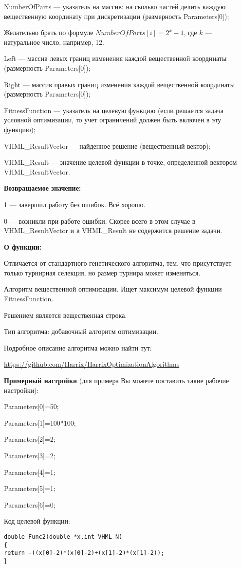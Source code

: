  NumberOfParts --- указатель на массив: на сколько частей делить каждую вещественную координату при дискретизации (размерность Parameters[0]);
 
  Желательно брать по формуле $NumberOfParts[i]=2^k-1$, где $k$ --- натуральное число, например, 12.
  
 Left --- массив левых границ изменения каждой вещественной координаты (размерность Parameters[0]);
 
 Right --- массив правых границ изменения каждой вещественной координаты (размерность Parameters[0]);
 
 FitnessFunction --- указатель на целевую функцию (если решается задача условной оптимизации, то учет ограничений должен быть включен в эту функцию);
 
 VHML\_ResultVector --- найденное решение (вещественный вектор);
 
 VHML\_Result --- значение целевой функции в точке, определенной вектором VHML\_ResultVector.

\textbf{Возвращаемое значение:} 

 1 --- завершил работу без ошибок. Всё хорошо.
 
 0 --- возникли при работе ошибки. Скорее всего в этом случае в VHML\_ResultVector и в VHML\_Result не содержится решение задачи.

\textbf{О функции:}

Отличается от стандартного генетического алгоритма, тем, что присутствует только турнирная селекция, но размер турнира может изменяться.

Алгоритм вещественной оптимизации. Ищет максимум целевой функции FitnessFunction.

Решением является вещественная строка.

Тип алгоритма: добавочный алгоритм оптимизации.

Подробное описание алгоритма можно найти тут:

\href{https://github.com/Harrix/HarrixOptimizationAlgorithms/blob/master/\_HarrixOptimizationAlgorithms.pdf}{https://github.com/Harrix/HarrixOptimizationAlgorithms}

\textbf{Примерный настройки} (для примера Вы можете поставить такие рабочие настройки):

 Parameters[0]=50;
 
Parameters[1]=100*100;

Parameters[2]=2;

Parameters[3]=2;

Parameters[4]=1;

Parameters[5]=1;

Parameters[6]=0;

Код целевой функции:
\begin{lstlisting}[caption=Оптимизируемая функция]
double Func2(double *x,int VHML_N)
{
return -((x[0]-2)*(x[0]-2)+(x[1]-2)*(x[1]-2));
}
\end{lstlisting}